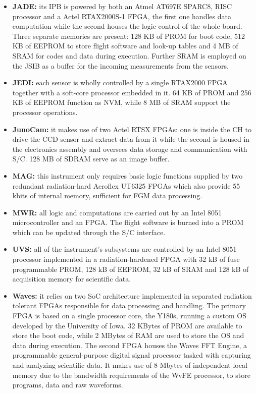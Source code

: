 \begin{itemize}
    \item \textbf{JADE:} its IPB is powered by both an Atmel AT697E SPARC8, RISC processor and a Actel RTAX2000S-1 FPGA, the first one handles data computation while the second houses the logic control of the whole board. Three separate memories are present: 128 KB of PROM for boot code, 512 KB of EEPROM to store flight software and look-up tables and 4 MB of SRAM for codes and data during execution. Further SRAM is employed on the JSIB as a buffer for the incoming measurements from the sensors. \cite{JADE_info}
    \item \textbf{JEDI:} each sensor is wholly controlled by a single RTAX2000 FPGA together with a soft-core processor embedded in it. 64 KB of PROM and 256 KB of EEPROM function as NVM, while 8 MB of SRAM support the processor operations. \cite{JEDI_info}
    \item \textbf{JunoCam:} it makes use of two Actel RTSX FPGAs: one is inside the CH to drive the CCD sensor and extract data from it while the second is housed in the electronics assembly and oversees data storage and communication with S/C. 128 MB of SDRAM serve as an image buffer. \cite{JunoCam_info}
    \item \textbf{MAG:} this instrument only requires basic logic functions supplied by two redundant radiation-hard Aeroflex UT6325 FPGAs which also provide 55 kbits of internal memory, sufficient for FGM data processing. \cite{MAG_info}
    \item \textbf{MWR:} all logic and computations are carried out by an Intel 8051 microcontroller and an FPGA. The flight software is burned into a PROM which can be updated through the S/C interface. \cite{MWR_info}
    \item \textbf{UVS:} all of the instrument's subsystems are controlled by an Intel 8051 processor implemented in a radiation-hardened FPGA with 32 kB of fuse programmable PROM, 128 kB of EEPROM, 32 kB of SRAM and 128 kB of acquisition memory for scientific data. \cite{UVS_info}
    \item \textbf{Waves:} it relies on two SoC architecture implemented in separated radiation tolerant FPGAs responsible for data processing and handling. The primary FPGA is based on a single processor core, the Y180s, running a custom OS developed by the University of Iowa. 32 KBytes of PROM are available to store the boot code, while 2 MBytes of RAM are used to store the OS and data during execution. The second FPGA houses the Waves FFT Engine, a programmable general-purpose digital signal processor tasked with capturing and analyzing scientific data. It makes use of 8 Mbytes of independent local memory due to the bandwidth requirements of the WvFE processor, to store programs, data and raw waveforms. \cite{Waves_info}  

\end{itemize}
